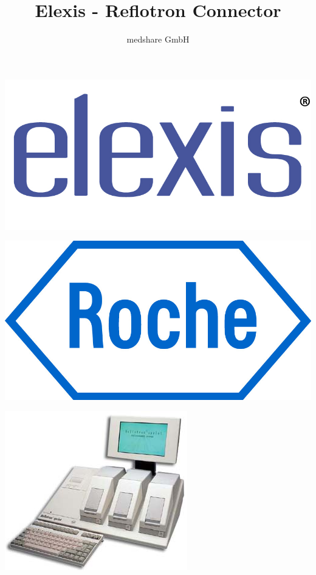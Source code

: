 \documentclass[a4paper]{scrartcl}
\title{Elexis - Reflotron Connector}
\author{medshare GmbH}
\begin{document}
\maketitle
	\begin{center}
		\includegraphics{elexis_logo}
	\end{center}
	\begin{center}
		\includegraphics{roche_logo}
	\end{center}
	\begin{center}
		\includegraphics{reflotron_device}
	\end{center}
\pagebreak
\end{document}
